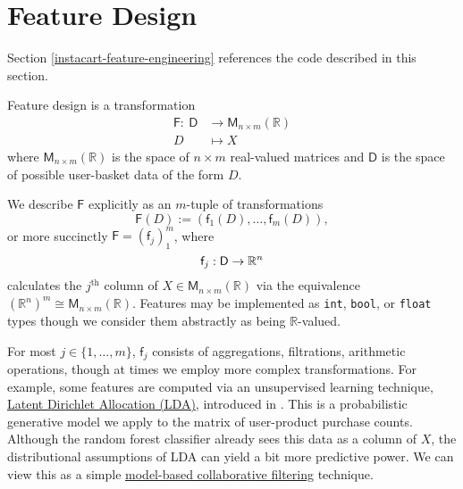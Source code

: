 \documentclass[11pt]{article}
\theoremstyle{definition}
\numberwithin{equation}{section}
\begin{document}


\hypertarget{feature-design}{%
  \section{Feature Design}\label{feature-design}}

Section \ref{instacart-feature-engineering} references the code described
in this section.

Feature design is a transformation
\begin{equation}\label{eq:feature-design}
\begin{split}
  \mathsf{F}  :  \ \mathsf{D} &\rightarrow \mathsf{M}_{n\times m} (\mathbb{R}) \\
         D &\mapsto X
\end{split}
\end{equation}
where \(\mathsf{M}_{n \times m} (\mathbb{R})\) is the space
of \(n \times m\) real-valued matrices and \(\mathsf{D}\) is the space
of possible user-basket data of the form \(D\).

We describe \(\mathsf{F}\) explicitly as an \(m\)-tuple of transformations
\begin{equation}
  \mathsf{F}(D) := (\mathsf{f}_1 (D), \ldots, \mathsf{f}_m(D)),
\end{equation} 
or more succinctly \(\mathsf{F} = (\mathsf{f}_j )_{1}^m\), where
\begin{equation}
  \mathsf{f}_j : \mathsf{D} \rightarrow \mathbb{R}^n \\
\end{equation} 
calculates the \(j^\text{th}\) column of
\(X \in \mathsf{M}_{n \times m} (\mathbb{R})\) via the equivalence
\(\left(\mathbb{R}^n\right)^m \cong \mathsf{M}_{n \times m} (\mathbb{R})\).
Features may be implemented as \texttt{int}, \texttt{bool}, or \texttt{float} types
though we consider them abstractly as being \(\mathbb{R}\)-valued.

For most \(j \in \{1, \ldots, m\}\), \(\mathsf{f}_j\) consists of aggregations,
filtrations, arithmetic operations, though at times we employ more
complex transformations. For example, some features are computed via an
unsupervised learning technique,
\href{https://en.wikipedia.org/wiki/Latent_Dirichlet_allocation}{Latent
  Dirichlet Allocation (LDA)}, introduced in
\cite{bleiLatentDirichletAllocation2003}. This is a probabilistic
generative model we apply to the matrix of user-product purchase counts.
Although the random forest classifier already sees this data as a column
of \(X\), the distributional assumptions of LDA can yield a bit more
predictive power. We can view this as a simple
\href{https://en.wikipedia.org/wiki/Collaborative_filtering\#Model-based}{model-based
  collaborative filtering} technique.
\end{document}
